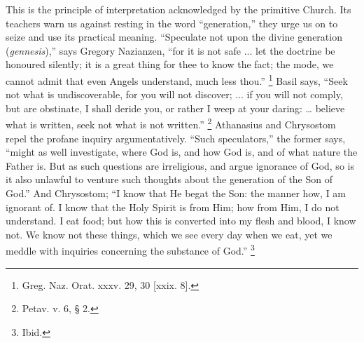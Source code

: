 This is the principle of interpretation acknowledged by the
primitive Church. Its teachers warn us against resting in the
word ``generation,'' they urge us on to seize and use its
practical meaning. ``Speculate not upon the divine generation (\emph{gennesis}),''
says Gregory Nazianzen, ``for it is not safe ... let the doctrine
be honoured silently; it is a great thing for thee to know the fact;
the mode, we cannot admit that even Angels understand, much less
thou.'' \footnote{Greg. Naz. Orat. xxxv. 29, 30 [xxix. 8].} Basil says,
``Seek not what is undiscoverable, for you will not discover; ...
if you will not comply, but are obstinate, I shall deride you, or
rather I weep at your daring: … believe what is written, seek not
what is not written.'' \footnote{Petav. v. 6, § 2.}
Athanasius and Chrysostom repel the profane inquiry argumentatively.
``Such speculators,'' the former says, ``might as well
investigate, where God is, and how God is, and of what nature the
Father is. But as such questions are irreligious, and argue ignorance
of God, so is it also unlawful to venture such thoughts about the
generation of the Son of God.'' And Chrysostom; ``I know that
He begat the Son: the manner how, I am ignorant of. I know that the
Holy Spirit is from Him; how from Him, I do not understand. I eat
food; but how this is converted into my flesh and blood, I know not.
We know not these things, which we see every day when we eat, yet we
meddle with inquiries concerning the substance of God.'' \footnote{Ibid.}

